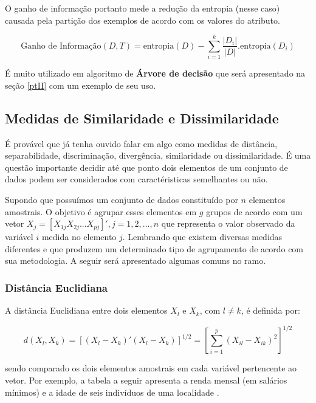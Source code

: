 \documentclass[
  openany]{book}
\begin{document}
O ganho de informação portanto mede a redução da entropia (nesse caso) causada pela partição dos exemplos de acordo com os valores do atributo.

\begin{equation} 
  \mbox{Ganho de Informação}(D,T)=\mbox{entropia}(D)-\displaystyle \sum_{i=1}^k \frac{|D_i|}{|D|}. \mbox{entropia}(D_i) 
  \label{eq:ganhodeinf}
\end{equation}

É muito utilizado em algoritmo de \textbf{Árvore de decisão} que será apresentado na seção \ref{ptII} com um exemplo de seu uso.

\hypertarget{meddist}{%
\subsection{Medidas de Similaridade e Dissimilaridade}\label{meddist}}

É provável que já tenha ouvido falar em algo como medidas de distância, separabilidade, discriminação, divergência, similaridade ou dissimilaridade. É uma questão importante decidir até que ponto dois elementos de um conjunto de dados podem ser considerados com caractéristicas semelhantes ou não.

Supondo que possuímos um conjunto de dados constituído por \(n\) elementos amostrais. O objetivo é agrupar esses elementos em \(g\) grupos de acordo com um vetor \(X_j=[X_{1j}X_{2j}...X_{pj}]', j=1,2,...,n\) que representa o valor observado da variável \(i\) medida no elemento \(j\). Lembrando que existem diversas medidas diferentes e que produzem um determinado tipo de agrupamento de acordo com sua metodologia. A seguir será apresentado algumas comuns no ramo.

\hypertarget{disteuclidana}{%
\subsubsection{Distância Euclidiana}\label{disteuclidana}}

A distância Euclidiana entre dois elementos \(X_l\) e \(X_k\), com \(l \neq k\), é definida por:

\begin{equation} 
  d(X_l,X_k)=[(X_l-X_k)'(X_l - X_k)]^{1/2}=[\displaystyle \sum^p_{i=1}(X_{il}-X_{ik})^2]^{1/2}
  \label{eq:euclidiana}
\end{equation}

sendo comparado os dois elementos amostrais em cada variável pertencente ao vetor. Por exemplo, a tabela a seguir apresenta a renda mensal (em salários mínimos) e a idade de seis indivíduos de uma localidade \citep{mingoti2007analise}.
\end{document}
